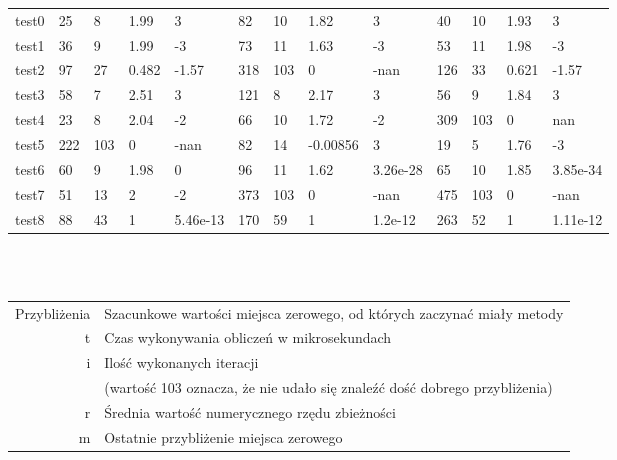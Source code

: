 \begin{table}[h]
\begin{tabular}{| l | l l l l| l l l l| l l l l|}
test0
&
25
&
8
&
1.99
&
3
&
82
&
10
&
1.82
&
3
&
40
&
10
&
1.93
&
3
\\
test1
&
36
&
9
&
1.99
&
-3
&
73
&
11
&
1.63
&
-3
&
53
&
11
&
1.98
&
-3
\\
test2
&
97
&
27
&
0.482
&
-1.57
&
318
&
103
&
0
&
-nan
&
126
&
33
&
0.621
&
-1.57
\\
test3
&
58
&
7
&
2.51
&
3
&
121
&
8
&
2.17
&
3
&
56
&
9
&
1.84
&
3
\\
test4
&
23
&
8
&
2.04
&
-2
&
66
&
10
&
1.72
&
-2
&
309
&
103
&
0
&
nan
\\
test5
&
222
&
103
&
0
&
-nan
&
82
&
14
&
-0.00856
&
3
&
19
&
5
&
1.76
&
-3
\\
test6
&
60
&
9
&
1.98
&
0
&
96
&
11
&
1.62
&
3.26e-28
&
65
&
10
&
1.85
&
3.85e-34
\\
test7
&
51
&
13
&
2
&
-2
&
373
&
103
&
0
&
-nan
&
475
&
103
&
0
&
-nan
\\
test8
&
88
&
43
&
1
&
5.46e-13
&
170
&
59
&
1
&
1.2e-12
&
263
&
52
&
1
&
1.11e-12
\\
    \hline  
  \end{tabular}\\\\
  \begin{tabular}{r | l}
    Przybliżenia  & Szacunkowe wartości miejsca zerowego, od których zaczynać miały metody\\
    t             & Czas wykonywania obliczeń w mikrosekundach\\
    i             & Ilość wykonanych iteracji \\ & \indent (wartość 103 oznacza, że nie udało się znaleźć dość dobrego przybliżenia)\\
    r             & Średnia wartość numerycznego rzędu zbieżności\\
    m             & Ostatnie przybliżenie miejsca zerowego\\
  \end{tabular}
\end{table}

